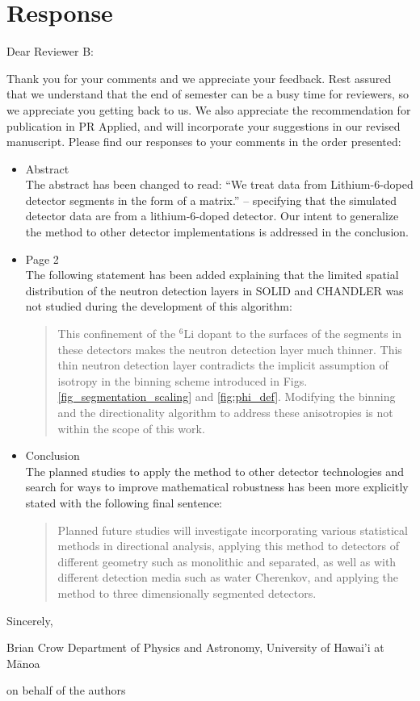 \section{Response}

Dear Reviewer B:

Thank you for your comments and we appreciate your feedback. Rest assured that we understand that the end of semester can be a busy time for reviewers, so we appreciate you getting back to us. We also appreciate the recommendation for publication in PR Applied, and will incorporate your suggestions in our revised manuscript. Please find our responses to your comments in the order presented:

\begin{itemize}
    \item Abstract \\ The abstract has been changed to read: ``We treat data from Lithium-6-doped detector segments in the form of a matrix.'' -- specifying that the simulated detector data are from a lithium-6-doped detector. Our intent to generalize the method to other detector implementations is addressed in the conclusion.
    \item Page 2 \\ The following statement has been added explaining that the limited spatial distribution of the neutron detection layers in SOLID and CHANDLER was not studied during the development of this algorithm: \\
    \begin{quote}
         This confinement of the ${}^6$Li dopant to the surfaces of the segments in these detectors makes the neutron detection layer much thinner. This thin neutron detection layer contradicts the implicit assumption of isotropy in the binning scheme introduced in Figs. \ref{fig_segmentation_scaling} and \ref{fig:phi_def}. Modifying the binning and the directionality algorithm to address these anisotropies is not within the scope of this work.
    \end{quote}
    \item Conclusion \\ The planned studies to apply the method to other detector technologies and search for ways to improve mathematical robustness has been more explicitly stated with the following final sentence: \\
    \begin{quote}
        Planned future studies will investigate incorporating various statistical methods in directional analysis, applying this method to detectors of different geometry such as monolithic and separated, as well as with different detection media such as water Cherenkov, and applying the method to three dimensionally segmented detectors. 
    \end{quote}
\end{itemize}

Sincerely,

Brian Crow
Department of Physics and Astronomy, University of Hawai'i at M\={a}noa

on behalf of the authors